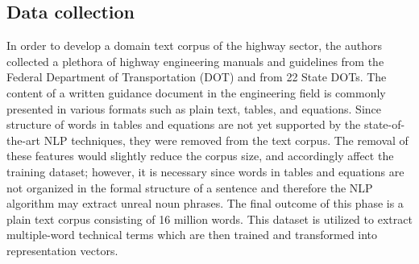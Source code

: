 \documentclass[Journal,InsideFigs, DoubleSpace]{ascelike} %
\begin{document}
\subsection{Data collection}
In order to develop a domain text corpus of the highway sector, the authors collected a plethora of highway engineering manuals and guidelines from the Federal Department of Transportation (DOT) and from 22 State DOTs. The content of a written guidance document in the engineering field is commonly presented in various formats such as plain text, tables, and equations. Since structure of words in tables and equations are not yet supported by the state-of-the-art NLP techniques, they were removed from the text corpus. The removal of these features would slightly reduce the corpus size, and accordingly affect the training dataset; however, it is necessary since words in tables and equations are not organized in the formal structure of a sentence and therefore the NLP algorithm may extract unreal noun phrases. The final outcome of this phase is a plain text corpus consisting of 16 million words. This dataset is utilized to extract multiple-word technical terms which are then trained and transformed into representation vectors.
%
\end{document}
